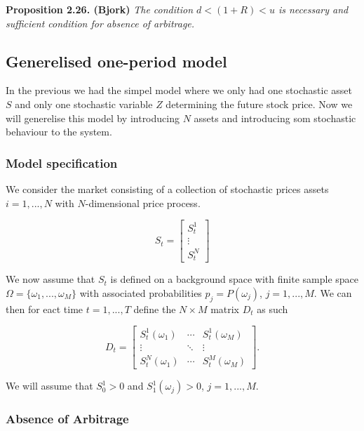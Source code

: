 \documentclass[a4paper,12pt,openany]{book}
\begin{document}
\textbf{Proposition 2.26. (Bjork)} \emph{The condition \(d<(1+R)<u\) is necessary and sufficient condition for absence of arbitrage.}

\hypertarget{generelised-one-period-model}{%
\subsection{Generelised one-period model}\label{generelised-one-period-model}}

In the previous we had the simpel model where we only had one stochastic asset \(S\) and only one stochastic variable \(Z\) determining the future stock price. Now we will generelise this model by introducing \(N\) assets and introducing som stochastic behaviour to the system.

\hypertarget{model-specification}{%
\subsubsection{Model specification}\label{model-specification}}

We consider the market consisting of a collection of stochastic prices assets \(i=1,...,N\) with \(N\)-dimensional price process.

\[
S_t=\begin{bmatrix} S_t^1\\
\vdots\\
S_t^N\end{bmatrix}
\]

We now assume that \(S_t\) is defined on a background space with finite sample space \(\Omega = \{\omega_1,...,\omega_M\}\) with associated probabilities \(p_j=P(\omega_j)\), \(j=1,...,M\). We can then for eact time \(t=1,...,T\) define the \(N\times M\) matrix \(D_t\) as such

\[
D_t=\begin{bmatrix} S_t^1(\omega_1)&\cdots &S_t^1(\omega_M)\\
\vdots &\ddots & \vdots\\
S_t^N(\omega_1) &\cdots&S_t^M(\omega_M)\end{bmatrix}.
\]

We will assume that \(S_0^1>0\) and \(S_1^1(\omega_j)>0\), \(j=1,...,M\).

\hypertarget{absence-of-arbitrage}{%
\subsubsection{Absence of Arbitrage}\label{absence-of-arbitrage}}
\end{document}
